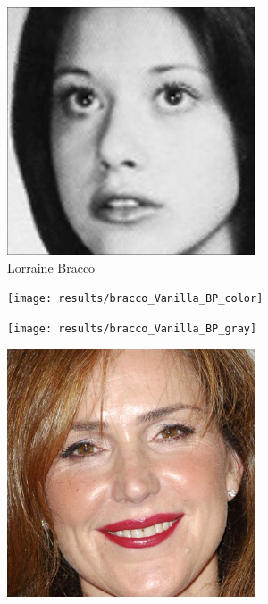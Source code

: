\documentclass{article}
\begin{document}
\begin{figure}
	\begin{subfigure}[t]{0.33\linewidth}
		\includegraphics[width=\linewidth]{most_bracco}
		\caption{Lorraine Bracco}
	\end{subfigure}
	\begin{subfigure}[t]{0.33\linewidth}
		\texttt{[image: results/bracco\_Vanilla\_BP\_color]}
	\end{subfigure}
	\begin{subfigure}[t]{0.33\linewidth}
		\texttt{[image: results/bracco\_Vanilla\_BP\_gray]}
	\end{subfigure}\vspace{1em}
	\begin{subfigure}[t]{0.33\linewidth}
		\includegraphics[width=\linewidth]{most_gilpin}

\end{subfigure}
\end{figure}
\end{document}
